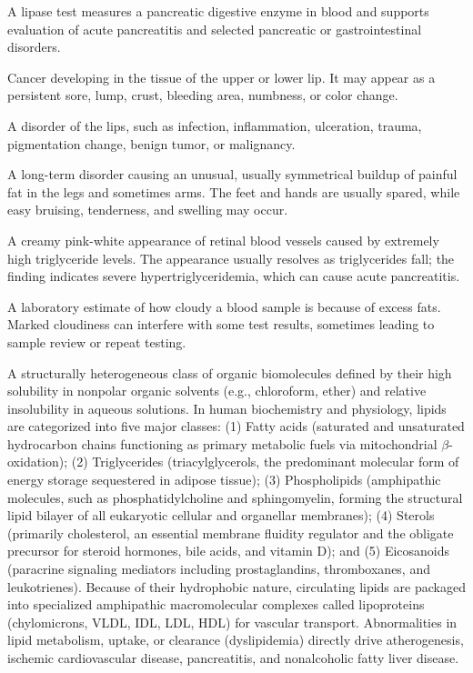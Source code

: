  A lipase test measures a pancreatic digestive enzyme in blood and supports evaluation of acute pancreatitis and selected pancreatic or gastrointestinal disorders.

 Cancer developing in the tissue of the upper or lower lip. It may appear as a persistent sore, lump, crust, bleeding area, numbness, or color change.

 A disorder of the lips, such as infection, inflammation, ulceration, trauma, pigmentation change, benign tumor, or malignancy.

 A long-term disorder causing an unusual, usually symmetrical buildup of painful fat in the legs and sometimes arms. The feet and hands are usually spared, while easy bruising, tenderness, and swelling may occur.

 A creamy pink-white appearance of retinal blood vessels caused by extremely high triglyceride levels. The appearance usually resolves as triglycerides fall; the finding indicates severe hypertriglyceridemia, which can cause acute pancreatitis.

 A laboratory estimate of how cloudy a blood sample is because of excess fats. Marked cloudiness can interfere with some test results, sometimes leading to sample review or repeat testing.

 A structurally heterogeneous class of organic biomolecules defined by their high solubility in nonpolar organic solvents (e.g., chloroform, ether) and relative insolubility in aqueous solutions. In human biochemistry and physiology, lipids are categorized into five major classes: (1) Fatty acids (saturated and unsaturated hydrocarbon chains functioning as primary metabolic fuels via mitochondrial $\beta$-oxidation); (2) Triglycerides (triacylglycerols, the predominant molecular form of energy storage sequestered in adipose tissue); (3) Phospholipids (amphipathic molecules, such as phosphatidylcholine and sphingomyelin, forming the structural lipid bilayer of all eukaryotic cellular and organellar membranes); (4) Sterols (primarily cholesterol, an essential membrane fluidity regulator and the obligate precursor for steroid hormones, bile acids, and vitamin D); and (5) Eicosanoids (paracrine signaling mediators including prostaglandins, thromboxanes, and leukotrienes). Because of their hydrophobic nature, circulating lipids are packaged into specialized amphipathic macromolecular complexes called lipoproteins (chylomicrons, VLDL, IDL, LDL, HDL) for vascular transport. Abnormalities in lipid metabolism, uptake, or clearance (dyslipidemia) directly drive atherogenesis, ischemic cardiovascular disease, pancreatitis, and nonalcoholic fatty liver disease.

